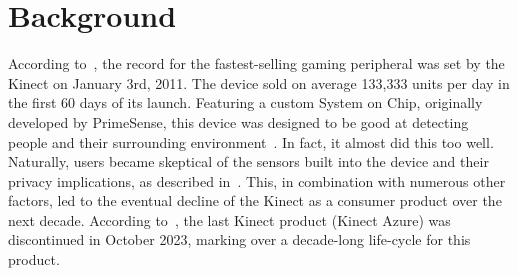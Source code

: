 \documentclass{article}
\title{\papertitle}
\begin{document}
\capstartfalse
\maketitle
\capstarttrue

\begin{abstract}
SCKinect is a SuperCollider plugin that allows users to interact with a Kinect sensor. Its core implementation contains a unit generator called 'Kinect', designed to output motion-tracking data to control buses. The plugin also includes commands, facilitating interaction with Kinect devices through the interpreter. The interpreted nature of SuperCollider and the server-language duality allow multimedia enthusiasts to efficiently communicate with technical rendering systems. This is perfect for live performances and interactive installations. With the addition of this plugin, performers can interact with the Kinect directly in SuperCollider with low latency. This paper will cover the implementation of the plugin and its potential applications.
\end{abstract}

\section{Background}\label{sec:background}
According to~\cite{noauthor_fastest-selling_nodate}, the record for the fastest-selling gaming peripheral was set by the Kinect on January 3rd, 2011. The device sold on average 133,333 units per day in the first 60 days of its launch. Featuring a custom System on Chip, originally developed by PrimeSense, this device was designed to be good at detecting people and their surrounding environment~\cite{boehm_natural_2012}. In fact, it almost did this too well. Naturally, users became skeptical of the sensors built into the device and their privacy implications, as described in~\cite{de_guzman_security_2020}. This, in combination with numerous other factors, led to the eventual decline of the Kinect as a consumer product over the next decade. According to~\cite{peters_microsoft_2023}, the last Kinect product (Kinect Azure) was discontinued in October 2023, marking over a decade-long life-cycle for this product.
\end{document}
